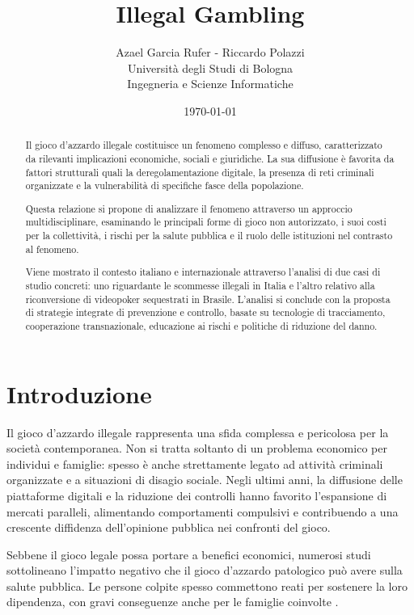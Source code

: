 \documentclass[a4paper,12pt]{article}
\title{\textbf{Illegal Gambling}}
\author{Azael Garcia Rufer - Riccardo Polazzi \\ Università degli Studi di Bologna \\ Ingegneria e Scienze Informatiche}
\date{\today}
\begin{document}
\maketitle

\begin{abstract}
    Il gioco d’azzardo illegale costituisce un fenomeno complesso e diffuso, caratterizzato da rilevanti implicazioni economiche, sociali e giuridiche. La sua diffusione è favorita da fattori strutturali quali la deregolamentazione digitale, la presenza di reti criminali organizzate e la vulnerabilità di specifiche fasce della popolazione.

    Questa relazione si propone di analizzare il fenomeno attraverso un approccio multidisciplinare, esaminando le principali forme di gioco non autorizzato, i suoi costi per la collettività, i rischi per la salute pubblica e il ruolo delle istituzioni nel contrasto al fenomeno.
    
    Viene mostrato il contesto italiano e internazionale attraverso l’analisi di due casi di studio concreti: uno riguardante le scommesse illegali in Italia e l’altro relativo alla riconversione di videopoker sequestrati in Brasile. L’analisi si conclude con la proposta di strategie integrate di prevenzione e controllo, basate su tecnologie di tracciamento, cooperazione transnazionale, educazione ai rischi e politiche di riduzione del danno.
\end{abstract}

\newpage
\tableofcontents
\newpage
\section{Introduzione}

Il gioco d’azzardo illegale rappresenta una sfida complessa e pericolosa per la società contemporanea. Non si tratta soltanto di un problema economico per individui e famiglie: spesso è anche strettamente legato ad attività criminali organizzate e a situazioni di disagio sociale. Negli ultimi anni, la diffusione delle piattaforme digitali e la riduzione dei controlli hanno favorito l’espansione di mercati paralleli, alimentando comportamenti compulsivi e contribuendo a una crescente diffidenza dell’opinione pubblica nei confronti del gioco.
\cite{banks2018taxonomy}

Sebbene il gioco legale possa portare a benefici economici, numerosi studi sottolineano l’impatto negativo che il gioco d’azzardo patologico può avere sulla salute pubblica. Le persone colpite spesso commettono reati per sostenere la loro dipendenza, con gravi conseguenze anche per le famiglie coinvolte \cite{gorsane2017illegalacts, lucchini2022socialcosts}.
\end{document}
